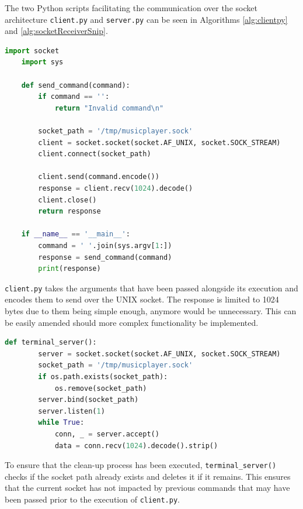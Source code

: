 The two Python scripts facilitating the communication over the socket architecture \texttt{client.py} and \texttt{server.py} can be seen in Algorithms \ref{alg:clientpy} and \ref{alg:socketReceiverSnip}.
\begin{algorithm}[H]
  \caption{client.py - Python}
  \label{alg:clientpy}
  \begin{lstlisting}[language=Python]
    import socket
    import sys

    def send_command(command):
        if command == '':
            return "Invalid command\n"
        
        socket_path = '/tmp/musicplayer.sock'
        client = socket.socket(socket.AF_UNIX, socket.SOCK_STREAM)
        client.connect(socket_path)
        
        client.send(command.encode())
        response = client.recv(1024).decode()
        client.close()
        return response

    if __name__ == '__main__':
        command = ' '.join(sys.argv[1:])
        response = send_command(command)
        print(response)
  \end{lstlisting}
\end{algorithm}
\texttt{client.py} takes the arguments that have been passed alongside its execution and encodes them to send over the UNIX socket. The response is limited to 1024 bytes due to them being simple enough, anymore would be unnecessary. This can be easily amended should more complex functionality be implemented.

\begin{algorithm}[H]
  \caption{terminal\_server() Snippet - Python}
  \label{alg:socketReceiverSnip}
  \begin{lstlisting}[language=Python]
    def terminal_server():
        server = socket.socket(socket.AF_UNIX, socket.SOCK_STREAM)
        socket_path = '/tmp/musicplayer.sock'
        if os.path.exists(socket_path):
            os.remove(socket_path)
        server.bind(socket_path)
        server.listen(1)
        while True:
            conn, _ = server.accept()
            data = conn.recv(1024).decode().strip()
  \end{lstlisting}
\end{algorithm}
To ensure that the clean-up process has been executed, \texttt{terminal\_server()} checks if the socket path already exists and deletes it if it remains. This ensures that the current socket has not impacted by previous commands that may have been passed prior to the execution of \texttt{client.py}.

